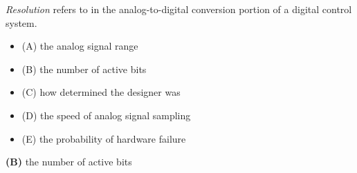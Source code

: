 

{\it Resolution} refers to \underbar{\hskip 50pt} in the analog-to-digital conversion portion of a digital control system.

\begin{itemize}
\item{(A)} the analog signal range
\vskip 5pt 
\item{(B)} the number of active bits
\vskip 5pt 
\item{(C)} how determined the designer was 
\vskip 5pt 
\item{(D)} the speed of analog signal sampling
\vskip 5pt 
\item{(E)} the probability of hardware failure 
\end{itemize}







{\bf (B)} the number of active bits
 










